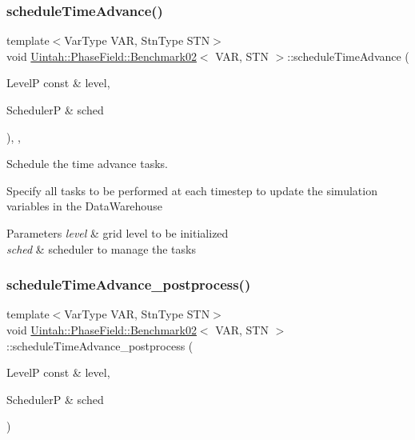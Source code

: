 \subsubsection{\texorpdfstring{schedule\+Time\+Advance()}{scheduleTimeAdvance()}}
{\footnotesize\ttfamily template$<$Var\+Type V\+AR, Stn\+Type S\+TN$>$ \\
void \hyperlink{classUintah_1_1PhaseField_1_1Benchmark02}{Uintah\+::\+Phase\+Field\+::\+Benchmark02}$<$ V\+AR, S\+TN $>$\+::schedule\+Time\+Advance (\begin{DoxyParamCaption}\item[{LevelP const \&}]{level,  }\item[{SchedulerP \&}]{sched }\end{DoxyParamCaption})\hspace{0.3cm}{\ttfamily [override]}, {\ttfamily [protected]}, {\ttfamily [virtual]}}



Schedule the time advance tasks. 

Specify all tasks to be performed at each timestep to update the simulation variables in the Data\+Warehouse


\begin{DoxyParams}{Parameters}
{\em level} & grid level to be initialized \\
\hline
{\em sched} & scheduler to manage the tasks \\
\hline
\end{DoxyParams}
\mbox{\label{classUintah_1_1PhaseField_1_1Benchmark02_a3f268a0901a1ba635474fa485d957ce2}} 
\subsubsection{\texorpdfstring{schedule\+Time\+Advance\+\_\+postprocess()}{scheduleTimeAdvance\_postprocess()}}
{\footnotesize\ttfamily template$<$Var\+Type V\+AR, Stn\+Type S\+TN$>$ \\
void \hyperlink{classUintah_1_1PhaseField_1_1Benchmark02}{Uintah\+::\+Phase\+Field\+::\+Benchmark02}$<$ V\+AR, S\+TN $>$\+::schedule\+Time\+Advance\+\_\+postprocess (\begin{DoxyParamCaption}\item[{LevelP const \&}]{level,  }\item[{SchedulerP \&}]{sched }\end{DoxyParamCaption})\hspace{0.3cm}{\ttfamily [protected]}}



